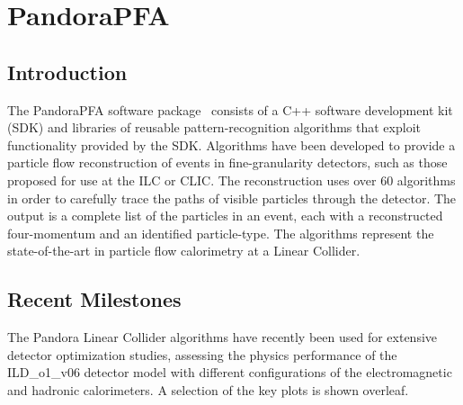 \section{PandoraPFA}


\subsection{Introduction}
The PandoraPFA software package~\cite{Thomson200925,Marshall2013153}
consists of a C++ software development kit (SDK) and
libraries of reusable pattern-recognition algorithms that exploit functionality
provided by the SDK. Algorithms have been developed to provide a particle flow
reconstruction of events in fine-granularity detectors, such as those proposed
for use at the ILC or CLIC. The reconstruction uses over 60 algorithms in order
to carefully trace the paths of visible particles through the detector. The
output is a complete list of the particles in an event, each with a
reconstructed four-momentum and an identified particle-type. The algorithms
represent the state-of-the-art in particle flow calorimetry at a Linear
Collider.

\subsection{Recent Milestones}
The Pandora Linear Collider algorithms have recently been used for
extensive detector optimization studies, assessing the physics performance of
the ILD\_o1\_v06 detector model with different configurations of the
electromagnetic and hadronic calorimeters. A selection of the key plots is shown
overleaf.

